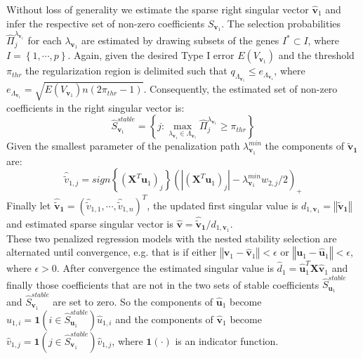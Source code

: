 Without loss of generality we estimate the sparse right singular vector $\mathbf{\hat{v}}_{1}$ and infer the respective set of non-zero coefficients $S_{\mathbf{v}_{1}}$. The selection probabilities $\hat{\Pi}_{j}^{\lambda_{\mathbf{v}_{1}}}$ for each $\lambda_{\mathbf{v}_{1}}$ are estimated by drawing subsets of the genes $I^{*} \subset I$, where $I=\left\{1,\cdots,p \right\}$. Again, given the desired Type I error $E(V_{\mathbf{v}_{1}})$ and the threshold $\pi_{thr}$ the regularization region is delimited such that $q_{\Lambda_{\mathbf{v}_{1}}} \leq e_{\Lambda_{\mathbf{v}_{1}}}$, where $e_{\Lambda_{\mathbf{v}_{1}}}= \sqrt{E(V_{\mathbf{v}_{1}})n(2\pi_{thr}-1)}$. 
Consequently, the estimated set of non-zero coefficients in the right singular vector is:
\begin{equation}
\hat{S}_{\mathbf{v}_{1}}^{stable}=\left\{j: \max_{\lambda_{\mathbf{v}_{1}} \in \Lambda_{\mathbf{v}_{1}}}\hat{\Pi}_{j}^{\lambda_{\mathbf{v}_{1}}} \geq \pi_{thr} \right\}
\end{equation}
Given the smallest parameter of the penalization path $\lambda^{min}_{\mathbf{v}_{1}}$ the components of $\mathbf{\tilde{v}_{1}}$ are:
\begin{equation}
     \hat{\tilde{v}}_{1,j}= \textit{sign}\left\{(\mathbf{X}^{T}\mathbf{u}_{1})_{j}\right\}(|(\mathbf{X}^{T}\mathbf{u}_{1})_{j}|-\lambda^{min}_{\mathbf{v}_{1}}w_{2,j}/2)_{+}
\end{equation}
Finally let $\mathbf{\hat{\tilde{v}}_{1}}=(\hat{\tilde{v}}_{1,1},\cdots,\hat{\tilde{v}}_{1,n})^{T}$, the updated first singular value is $d_{1,\mathbf{v}_{1}}=\left\Vert\mathbf{\tilde{v}_{1}}\right\Vert$ and estimated sparse singular vector is $\mathbf{\hat{v}}=\mathbf{\hat{\tilde{v}}_{1}}/d_{1,\mathbf{v}_{1}}$. \\
These two penalized regression models with the nested stability selection are alternated until convergence, e.g. that is if either $\left\Vert \mathbf{v}_{1} - \mathbf{\hat{v}}_{1}\right\Vert < \epsilon$ or $\left\Vert \mathbf{u}_{1} - \mathbf{\hat{u}}_{1} \right\Vert < \epsilon$, where $\epsilon > 0$.
After convergence the estimated singular value is $\hat{d}_{1}=\mathbf{\hat{u}}_{1}^{T}\mathbf{X}\mathbf{\hat{v}}_{1}$ and finally those coefficients that are not in the two sets of stable coefficients $\hat{S}_{\mathbf{u}_{1}}^{stable}$ and $\hat{S}_{\mathbf{v}_{1}}^{stable}$ are set to zero. So the components of $\hat{\mathbf{u}}_{1}$ become $\hat{u}_{1,i}=\mathbf{1}(i \in \hat{S}_{\mathbf{u}_{1}}^{stable})\hat{u}_{1,i}$ and the components of $\hat{\mathbf{v}}_{1}$ become $\hat{v}_{1,j}=\mathbf{1}(j \in \hat{S}_{\mathbf{v}_{1}}^{stable}  )\hat{v}_{1,j}$, where $\mathbf{1}(\cdot)$ is an indicator function.
